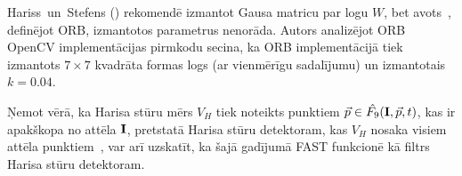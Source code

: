 
Hariss~un~Stefens\cite{Harris} ()
rekomendē izmantot Gausa matricu par logu
$W$, bet avots~\cite{ORB}, definējot ORB, izmantotos parametrus nenorāda.
Autors analizējot ORB OpenCV implementācijas pirmkodu\cite{OpenCV-src}
secina, ka ORB implementācijā tiek izmantots $7 \times 7$ kvadrāta formas
logs (ar vienmērīgu sadalījumu) un izmantotais $k=0.04$.

Ņemot vērā, ka Harisa stūru mērs $V_H$ tiek noteikts punktiem
$\vec{p} \in \hat{F_9}(\mathbf{I}, \vec{p}, t)$, kas ir apakškopa no attēla
$\mathbf{I}$, pretstatā Harisa stūru detektoram, kas $V_H$ nosaka visiem attēla
punktiem~\cite{Harris}, var arī uzskatīt, ka šajā gadījumā FAST funkcionē kā
filtrs Harisa stūru detektoram.
